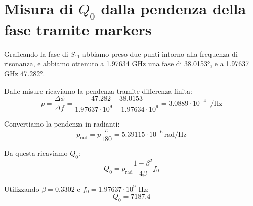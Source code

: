 \documentclass[11pt,a4paper,oneside]{book}
\begin{document}
\section{Misura di $Q_0$ dalla pendenza della fase tramite markers}
Graficando la fase di $S_{11}$ abbiamo preso due punti intorno alla frequenza di risonanza, e abbiamo ottenuto a 
1.97634 GHz una fase di 38.0153°, e a 1.97637 GHz 47.282°.

Dalle misure ricaviamo la pendenza tramite differenza finita:
\begin{equation}
    p=\frac{\Delta\phi}{\Delta f}
    =\frac{47.282-38.0153}
    {1.97637\cdot10^9-1.97634\cdot10^9}
    =3.0889\cdot10^{-4}\,^\circ/\mathrm{Hz}
\end{equation}

Convertiamo la pendenza in radianti:
\begin{equation}
    p_{\mathrm{rad}}=p\frac{\pi}{180}
    =5.39115\cdot10^{-6}\,\mathrm{rad/Hz}
\end{equation}

Da questa ricaviamo $Q_0$:
\begin{equation}
    Q_0=p_{\mathrm{rad}}\frac{1-\beta^2}{4\beta}f_0
\end{equation}

Utilizzando $\beta=0.3302$ e $f_0=1.97637\cdot10^9$ Hz:
\begin{equation}
    Q_0=7187.4
\end{equation}
\end{document}

